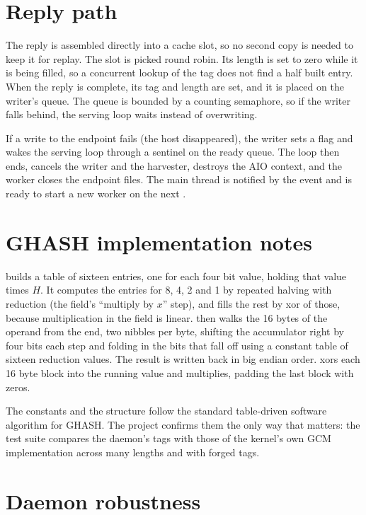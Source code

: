 \section{Reply path}

The reply is assembled directly into a cache slot, so no second copy is needed to keep it for replay. The slot is picked round robin. Its length is set to zero while it is being filled, so a concurrent lookup of the tag does not find a half built entry. When the reply is complete, its tag and length are set, and it is placed on the writer's queue. The queue is bounded by a counting semaphore, so if the writer falls behind, the serving loop waits instead of overwriting.

If a write to the endpoint fails (the host disappeared), the writer sets a flag and wakes the serving loop through a sentinel on the ready queue. The loop then ends,  cancels the writer and the harvester, destroys the AIO context, and the worker closes the endpoint files. The main thread is notified by the  event and is ready to start a new worker on the next .

\section{GHASH implementation notes}

 builds a table of sixteen entries, one for each four bit value, holding that value times $H$. It computes the entries for 8, 4, 2 and 1 by repeated halving with reduction (the field's ``multiply by $x$'' step), and fills the rest by xor of those, because multiplication in the field is linear.  then walks the 16 bytes of the operand from the end, two nibbles per byte, shifting the accumulator right by four bits each step and folding in the bits that fall off using a constant table of sixteen reduction values. The result is written back in big endian order.  xors each 16 byte block into the running value and multiplies, padding the last block with zeros.

The constants and the structure follow the standard table-driven software algorithm for GHASH. The project confirms them the only way that matters: the test suite compares the daemon's tags with those of the kernel's own GCM implementation across many lengths and with forged tags.

\section{Daemon robustness}

